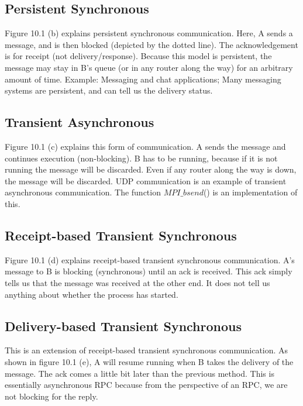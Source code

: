 \documentclass[twoside]{article}
\begin{document}
\subsection{Persistent Synchronous}
Figure 10.1 (b) explains persistent synchronous communication. Here, A sends a message, and is then blocked (depicted by the dotted line). The acknowledgement is for receipt (not delivery/response). Because this model is persistent, the message may stay in B's queue (or in any router along the way) for an arbitrary amount of time. Example: Messaging and chat applications; Many messaging systems are persistent, and can tell us the delivery status.

\subsection{Transient Asynchronous}
Figure 10.1 (c) explains this form of communication. A sends the message and continues execution (non-blocking). B has to be running, because if it is not running the message will be discarded. Even if any router along the way is down, the message will be discarded. UDP communication is an example of transient asynchronous communication. The function $MPI\_bsend$() is an implementation of this.


\subsection{Receipt-based Transient Synchronous}
Figure 10.1 (d) explains receipt-based transient synchronous communication. A's message to B is blocking (synchronous) until an ack is received. This ack simply tells us that the message was received at the other end. It does not tell us anything about whether the process has started.


\subsection{Delivery-based Transient Synchronous}
This is an extension of receipt-based transient synchronous communication. As shown in figure 10.1 (e), A will resume running when B takes the delivery of the message. The ack comes a little bit later than the previous method. This is essentially asynchronous RPC because from the perspective of an RPC, we are not blocking for the reply.
\end{document}
